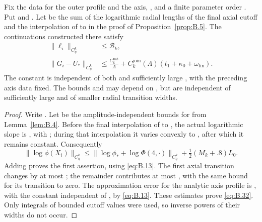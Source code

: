 \begin{lemma}\label{lem:B.7}
Fix the data for the outer profile and the axis, , and a finite parameter order
. Put  and
. Let  be the sum of the logarithmic radial lengths of the
final axial cutoff and the interpolation of  to
 in the proof of Proposition~\ref{prop:B.5}. The continuations
constructed there satisfy
\begin{equation}
\begin{aligned}
  \lVert\ell_i\rVert_{C_\eta^k}&\leq\mathcal B_k,\\
  \lVert G_i-U_*\rVert_{C_\eta^k}&\leq\frac{C_k^{\mathrm{nat}}}{\Lambda}
    +C_k^{\mathrm{join}}(\Lambda)(t_1+\kappa_0+\omega_{\mathrm{fin}}).
\end{aligned}
\tag{B.32}\label{eq:B.32}
\end{equation}
The constant  is independent of both
 and sufficiently large , with the preceding axis data fixed.
The bounds  and  may depend on
, but are independent of sufficiently large  and of
smaller radial transition widths.
\end{lemma}
\begin{proof}
Write . Let  be the amplitude-independent bounds for
 from Lemma~\ref{lem:B.4}. Before the final interpolation of
 to , the actual logarithmic slope is
, with ; during that interpolation it varies convexly to
, after which it remains constant. Consequently
\[
  \lVert\log\phi(X_i)\rVert_{C_\eta^k}
  \leq\lVert\log\phi_*+\log\Phi(4,\mathord\cdot)\rVert_{C_\eta^k}
  +\tfrac12(M_k+.8)L_0.
\]
Adding  proves the first assertion, using \eqref{eq:B.13}. The first axial transition changes
 by at most ; the remainder contributes at most
, with the same bound for its transition to zero. The approximation error for the analytic axis profile is
, with the constant independent of
, by \eqref{eq:B.13}. These estimates prove \eqref{eq:B.32}. Only integrals
of bounded cutoff values were used, so inverse powers of their widths do not occur.
\end{proof}

